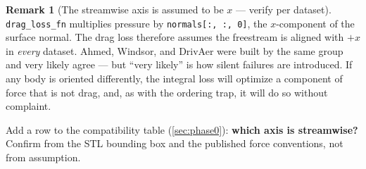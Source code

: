 \documentclass[10pt,a4paper]{article}
\theoremstyle{definition}
\newtheorem{remark}{Remark}[section]
\begin{document}
\begin{remark}[The streamwise axis is assumed to be $x$ --- verify per dataset]
\label{rem:streamwise}
\texttt{drag\_loss\_fn} multiplies pressure by \texttt{normals[:, :, 0]}, the
$x$-component of the surface normal. The drag loss therefore assumes the freestream is
aligned with $+x$ in \emph{every} dataset. Ahmed, Windsor, and DrivAer were built by the
same group and very likely agree --- but ``very likely'' is how silent failures are
introduced. If any body is oriented differently, the integral loss will optimize a
component of force that is not drag, and, as with the ordering trap, it will do so
without complaint.

Add a row to the compatibility table (\cref{sec:phase0}): \textbf{which axis is
streamwise?} Confirm from the STL bounding box and the published force conventions, not
from assumption.
\end{remark}
\end{document}
